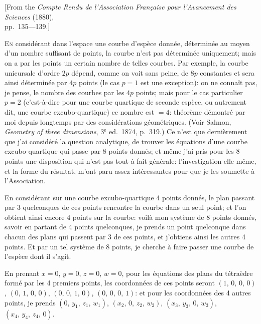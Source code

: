 \documentclass[12pt,a4paper,oneside]{book}
\theoremstyle{plain}
\theoremstyle{definition}
\theoremstyle{remark}
\begin{document}
\begin{center}
[From the \textit{Compte Rendu de l'Association Fran\c{c}aise pour l'Avancement des Sciences} (1880),\\ pp.~135---139.]
\end{center}
\medskip

\textsc{En} consid\'erant dans l'espace une courbe d'esp\`ece donn\'ee, d\'etermin\'ee au moyen d'un nombre suffisant de points, la courbe n'est pas d\'etermin\'ee uniquement; mais on a par les points un certain nombre de telles courbes. Par exemple, la courbe unicursale d'ordre $2p$ d\'epend, comme on voit sans peine, de $8p$ constantes et sera ainsi d\'etermin\'ee par $4p$ points (le cas $p=1$ est une exception): on ne conna\^it pas, je pense, le nombre des courbes par les $4p$ points; mais pour le cas particulier $p=2$ (c'est-\`a-dire pour une courbe quartique de seconde esp\`ece, ou autrement dit, une courbe excubo-quartique) ce nombre est $=4$: th\'eor\`eme d\'emontr\'e par moi depuis longtemps par des consid\'erations g\'eom\'etriques. (Voir Salmon, \textit{Geometry of three dimensions}, 3$^\text{e}$ ed.\ 1874, p.~319.) Ce n'est que derni\`erement que j'ai consid\'er\'e la question analytique, de trouver les \'equations d'une courbe excubo-quartique qui passe par 8 points donn\'es; et m\^eme j'ai pris pour les 8 points une disposition qui n'est pas tout \`a fait g\'en\'erale: l'investigation elle-m\^eme, et la forme du r\'esultat, m'ont paru assez int\'eressantes pour que je les soumette \`a l'Association.

En consid\'erant sur une courbe excubo-quartique 4 points donn\'es, le plan passant par 3 quelconques de ces points rencontre la courbe dans un seul point; et l'on obtient ainsi encore 4 points sur la courbe: voil\`a mon syst\`eme de 8 points donn\'es, savoir en partant de 4 points quelconques, je prends un point quelconque dans chacun des plans qui passent par 3 de ces points, et j'obtiens ainsi les autres 4 points. Et par un tel syst\`eme de 8 points, je cherche \`a faire passer une courbe de l'esp\`ece dont il s'agit.

En prenant $x=0$, $y=0$, $z=0$, $w=0$, pour les \'equations des plans du t\'etra\`edre form\'e par les 4 premiers points, les coordonn\'ees de ces points seront $(1,\, 0,\, 0,\, 0)$, $(0,\, 1,\, 0,\, 0)$, $(0,\, 0,\, 1,\, 0)$, $(0,\, 0,\, 0,\, 1)$: et pour les coordonn\'ees des 4 autres points, je prends $(0,\, y_1,\, z_1,\, w_1)$, $(x_2,\, 0,\, z_2,\, w_2)$, $(x_3,\, y_3,\, 0,\, w_3)$, $(x_4,\, y_4,\, z_4,\, 0)$.
\end{document}
